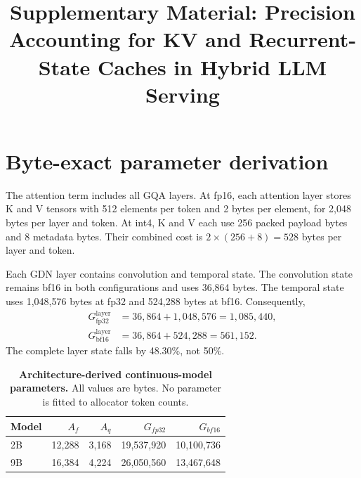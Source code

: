 \documentclass[conference,letterpaper,10pt]{IEEEtran}
\begin{document}
\title{Supplementary Material: Precision Accounting for KV and Recurrent-State Caches in Hybrid LLM Serving}
\author{%
}
\maketitle

\section{Byte-exact parameter derivation}
\label{app:bytes}

The attention term includes all GQA layers. At fp16, each attention layer
stores K and V tensors with 512 elements per token and 2 bytes per element,
for 2,048 bytes per layer and token. At int4, K and V each use 256 packed
payload bytes and 8 metadata bytes. Their combined cost is
$2\times(256+8)=528$ bytes per layer and token.

Each GDN layer contains convolution and temporal state. The convolution state
remains bf16 in both configurations and uses 36,864 bytes. The temporal state
uses 1,048,576 bytes at fp32 and 524,288 bytes at bf16. Consequently,
\begin{align}
G^{\mathrm{layer}}_{\mathrm{fp32}} &= 36{,}864+1{,}048{,}576
 = 1{,}085{,}440,\\
G^{\mathrm{layer}}_{\mathrm{bf16}} &= 36{,}864+524{,}288
 = 561{,}152.
\end{align}
The complete layer state falls by 48.30\%, not 50\%.

\begin{table}[t]
\centering
\small
\caption{\textbf{Architecture-derived continuous-model parameters.} All
values are bytes. No parameter is fitted to allocator token counts.}
\label{tab:parameters}
\setlength{\tabcolsep}{4pt}
\begin{tabular}{lrrrr}
\toprule
Model & $A_f$ & $A_q$ & $G_{fp32}$ & $G_{bf16}$\\
\midrule
2B & 12,288 & 3,168 & 19,537,920 & 10,100,736\\
9B & 16,384 & 4,224 & 26,050,560 & 13,467,648\\
\bottomrule
\end{tabular}
\end{table}
\end{document}
